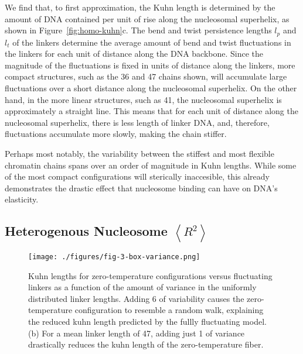 \documentclass[%
 reprint,
superscriptaddress,
showpacs,preprintnumbers,
 amsmath,amssymb,
 aps,
 prl,
]{revtex4-1}
\newcommand{\RR}{\left\langle{}R^2\right\rangle{}}
\begin{document}
We find that, to first approximation, the Kuhn length is determined by the
    amount of DNA contained per unit of rise along the nucleosomal superhelix,
    as shown in Figure~\ref{fig:homo-kuhn}c.
The bend and twist persistence lengths $l_p$ and $l_t$ of the linkers determine
    the average amount of bend and twist fluctuations in the linkers for each
    unit of distance along the DNA backbone.
Since the magnitude of the fluctuations is fixed in units of distance along the
    linkers, more compact structures, such as the \SI{36}{\basepair} and
    \SI{47}{\basepair} chains shown, will accumulate large fluctuations over a
    short distance along the nucleosomal superhelix.
On the other hand, in the more linear structures, such as \SI{41}{\basepair},
    the nucleosomal superhelix is approximately a straight line.
This means that for each unit of distance along the nucleosomal superhelix,
    there is less length of linker DNA, and, therefore, fluctuations accumulate
    more slowly, making the chain stiffer.

Perhaps most notably, the variability between the stiffest and most flexible
    chromatin chains spans over an order of magnitude in Kuhn lengths.
While some of the most compact configurations will sterically inaccesible, this
    already demonstrates the drastic effect that nucleosome binding can have on
    DNA's elasticity.

\subsection{\label{sec:homo-kuhn}Heterogenous Nucleosome $\RR$}



\begin{figure}[t]
    \centering
    \texttt{[image: ./figures/fig-3-box-variance.png]}
    \caption{Kuhn lengths for zero-temperature configurations versus
    fluctuating linkers as a function of the amount of variance in the uniformly
    distributed linker lengths.  Adding \SI{6}{\basepair} of variability causes the zero-temperature
    configuration to resemble a random walk, explaining the reduced kuhn
    length predicted by the fullly fluctuating model. (b) For a mean linker
    length of \SI{47}{\basepair}, adding just \SI{1}{\basepair} of variance
    drastically reduces the kuhn length of the zero-temperature fiber.}
\end{figure}
\end{document}
